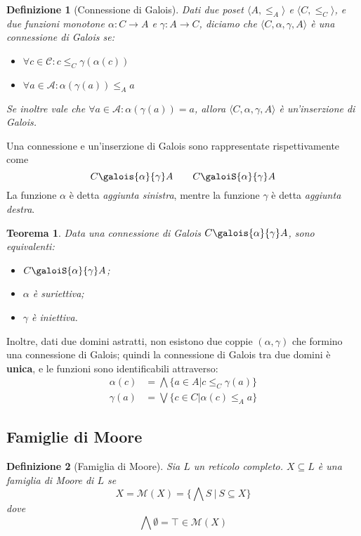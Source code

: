 \documentclass[a4paper, 10pt]{article}
\newcommand{\galoistuple}{\langle C, \alpha, \gamma , A \rangle}
\newtheorem{definit}{Definizione}[subsection]
\newtheorem{thm}{Teorema}[subsection]
\begin{document}
	\begin{definit}[Connessione di Galois]
		Dati due poset $\langle A , \leq_A \rangle$ e $\langle C , \leq_C \rangle$, e due funzioni monotone $\alpha: C \to A$ e $\gamma: A \to C$, diciamo che $\galoistuple$ è una connessione di Galois se:
		\begin{itemize}
			\item $\forall c \in \mathcal{C}: c \leq_C \gamma(\alpha(c))$
			\item $\forall a \in \mathcal{A}: \alpha(\gamma(a)) \leq_A a$
		\end{itemize}
		
		Se inoltre vale che $\forall a \in \mathcal{A}: \alpha(\gamma(a)) = a$, allora $\galoistuple$ è un'inserzione di Galois.
	\end{definit}
	Una connessione e un'inserzione di Galois sono rappresentate rispettivamente come \[  C \galois{\alpha}{\gamma} A \qquad C \galoiS{\alpha}{\gamma} A \]
	La funzione $\alpha$ è detta \textit{aggiunta sinistra}, mentre la funzione $\gamma$ è detta \textit{aggiunta destra}.
	
	\begin{thm}
		Data una connessione di Galois $ C \galois{\alpha}{\gamma} A$, sono equivalenti:
		\begin{itemize}
			\item $C \galoiS{\alpha}{\gamma} A$;
			\item $\alpha$ è suriettiva;
			\item $\gamma$ è iniettiva.
		\end{itemize}
	\end{thm}

	Inoltre, dati due domini astratti, non esistono due coppie $(\alpha, \gamma)$ che formino una connessione di Galois; quindi la connessione di Galois tra due domini è \textbf{unica}, e le funzioni sono identificabili attraverso:
	\begin{align*}
		\alpha(c) &= \bigwedge \lbrace a \in A \vert c \leq_C \gamma(a) \rbrace \\
		\gamma(a) &= \bigvee \lbrace c \in C \vert \alpha(c) \leq_A a \rbrace
	\end{align*}
	
	\subsection{Famiglie di Moore}
	\begin{definit}[Famiglia di Moore]
		Sia $L$ un reticolo completo. $X \subseteq L$ è una famiglia di Moore di $L$ se \[ X = \mathcal{M}(X) = \Big\{ \bigwedge S\ \vert\ S \subseteq X \Big\} \] dove \[ \bigwedge \emptyset = \top \in \mathcal{M}(X) \]
	\end{definit}
	
\end{document}
